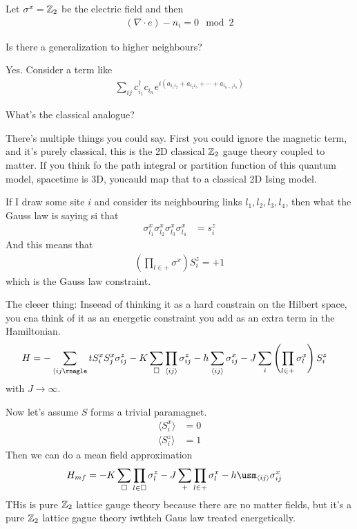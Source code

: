 Let $\sigma^x = \mathbb{Z}_2$ be the electric field and then
\begin{align}
    \left( \nabla\cdot e \right) - n_i = 0 \mod 2
\end{align}

\begin{question}
    Is there a generalization to higher neighbours?
\end{question}
Yes.
Consider a term like
\begin{align}
    \sum_{ij}
    c_{i_1}^\dagger c_{i_n}
    e^{i\left( 
    a_{i_1 i_2}
    + a_{i_2 i_3}
    + \cdots +
    a_{i_{n-1} i_n}
    \right)}
\end{align}

\begin{question}
    What's the classical analogue?
\end{question}
There's multiple things you could say.
First you could ignore the magnetic term,
and it's purely classical,
this is the 2D classical $\mathbb{Z}_2$ gauge theory coupled to matter.
If you think fo the path integral or partition function of this quantum model,
spacetime is 3D,
youcauld map that to a classical 2D Ising model.

If I draw some site $i$ and consider its neighbouring links $l_1,l_2,l_3,l_4$,
then what the Gauss law is saying si that
\begin{align}
    \sigma_{l_1}^x
    \sigma_{l_2}^x
    \sigma_{l_3}^x
    \sigma_{l_4}^x
    &=
    s_i^z
\end{align}
And this means that
\begin{align}
    \left( 
    \prod_{l\in +} \sigma^x
    \right)
    S_i^z
    = +1
\end{align}
which is the Gauss law constraint.

The cleeer thing:
Inseead of thinking it as a hard constrain on the Hilbert space,
you cna think of it as an energetic constraint you add as an extra term in the
Hamiltonian.
\begin{align}
    H &=
    -\sum_{\langle ij \rnagle}
    t S_i^x S_j^x \sigma_{ij}^z
    -
    K \sum_{\square} \prod_{\langle ij \rangle} \sigma_{ij}^z
    - h \sum_{\langle ij \rangle} \sigma_{ij}^x
    - J \sum_i
    \left( 
    \prod_{l \in +} \sigma_l^x
    \right)
    S_i^z
\end{align}
with $J\to\infty$.


Now let's assume $S$ forms a trivial paramagnet.
\begin{align}
    \langle S_i^x \rangle &= 0\\
    \langle S_i^z \rangle &= 1
\end{align}
Then we can do a mean field approximation
\begin{align}
    H_{mf} &=
    - K \sum_{\square} \prod_{l\in\square} \sigma_l^z
    - J\sum_{+} \prod_{l \in +} \sigma_l^x
    - h\usm_{\langle ij\rangle} \sigma_{ij}^x
\end{align}
THis is pure $\mathbb{Z}_2$ lattice gauge theory because there are no matter fields,
but it's a pure $\mathbb{Z}_2$ lattice gague theory iwthteh Gaus law treated
energetically.

